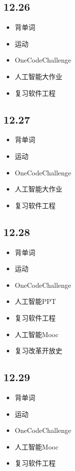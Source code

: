 \documentclass[UTF8]{ctexart}
\begin{document}
\subsection*{12.26}
\begin{itemize}
    \item 背单词
    \item 运动
    \item OneCodeChallenge
    \item 人工智能大作业
    \item 复习软件工程
\end{itemize}

\subsection*{12.27}
\begin{itemize}
    \item 背单词
    \item 运动
    \item OneCodeChallenge
    \item 人工智能大作业
    \item 复习软件工程
\end{itemize}

\subsection*{12.28}
\begin{itemize}
    \item 背单词
    \item 运动
    \item OneCodeChallenge
    \item 人工智能PPT
    \item 复习软件工程
    \item 人工智能Mooc
    \item 复习改革开放史
\end{itemize}

\subsection*{12.29}
\begin{itemize}
    \item 背单词
    \item 运动
    \item OneCodeChallenge
    \item 人工智能Mooc
    \item 复习软件工程
\end{itemize}
\end{document}
